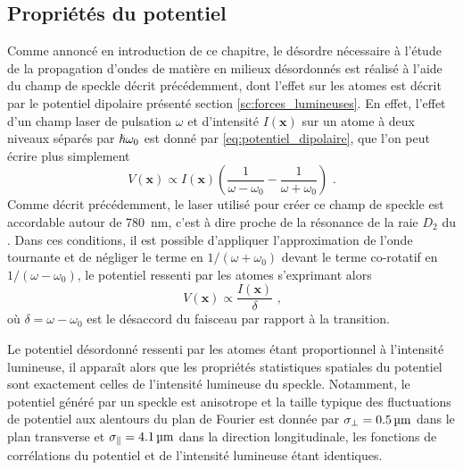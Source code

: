 \subsection{Propriétés du potentiel}
\label{sc:propriete_potentiel_speckle}
Comme annoncé en introduction de ce chapitre, le désordre nécessaire à l'étude de la propagation d'ondes de matière en milieux désordonnés est réalisé à l'aide du champ de speckle décrit précédemment, dont l'effet sur les atomes est décrit par le potentiel dipolaire présenté section \ref{sc:forces_lumineuses}. En effet, l'effet d'un champ laser de pulsation $\omega$ et d'intensité $I(\mathbf{x})$ sur un atome à deux niveaux séparés par $\hslash \omega_0$ est donné par \ref{eq:potentiel_dipolaire}, que l'on peut écrire plus simplement 
\begin{equation}
V(\mathbf{x}) \propto I(\mathbf{x}) \left( \frac{1}{\omega-\omega_0} - \frac{1}{\omega+\omega_0} \right) \text{ .}
\end{equation}
Comme décrit précédemment, le laser utilisé pour créer ce champ de speckle est accordable autour de \SI{780}{\nano\metre}, c'est à dire proche de la résonance de la raie $D_2$ du . Dans ces conditions, il est possible d'appliquer l'approximation de l'onde tournante et de négliger le terme en $1/(\omega+\omega_0)$ devant le terme co-rotatif en $1/(\omega-\omega_0)$, le potentiel ressenti par les atomes s'exprimant alors
\begin{equation}
V(\mathbf{x}) \propto \frac{I(\mathbf{x})}{\delta} \text{ ,}
\label{eq:potentiel_dipolaire_approx}
\end{equation}
où $\delta=\omega-\omega_0$ est le désaccord du faisceau par rapport à la transition. 

Le potentiel désordonné ressenti par les atomes étant proportionnel à l'intensité lumineuse, il apparaît alors que les propriétés statistiques spatiales du potentiel sont exactement celles de l'intensité lumineuse du speckle. Notamment, le potentiel généré par un speckle est anisotrope et la taille typique des fluctuations de potentiel aux alentours du plan de Fourier est donnée par $\sigma_{\perp}=\SI{0.5}{\micro\metre}$ dans le plan transverse et $\sigma_{\parallel}=\SI{4.1}{\micro\metre}$ dans la direction longitudinale, les fonctions de corrélations du potentiel et de l'intensité lumineuse étant identiques.

